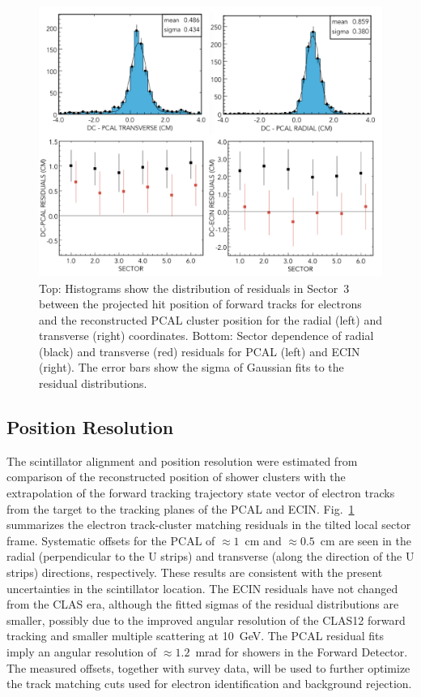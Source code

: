 \begin{figure}[t]
\centering
\includegraphics[width=1.0\columnwidth,keepaspectratio]{img/S10_1_3.png}
\caption[]{Top: Histograms show the distribution of residuals in Sector~3 between the projected hit position of
  forward tracks for electrons and the reconstructed PCAL cluster position for the radial (left) and transverse
  (right) coordinates. Bottom: Sector dependence of radial (black) and transverse (red) residuals for PCAL (left)
  and ECIN (right). The error bars show the sigma of Gaussian fits to the residual distributions.}
\label{fig:S10_1_3}
\end{figure}

\subsection{Position Resolution}

The scintillator alignment and position resolution were estimated from comparison of the reconstructed position of
shower clusters with the extrapolation of the forward tracking trajectory state vector of electron tracks from the
target to the tracking planes of the PCAL and ECIN. Fig.~\ref{fig:S10_1_3} summarizes the electron track-cluster
matching residuals in the tilted local sector frame. Systematic offsets for the PCAL of $\approx 1$~cm and
$\approx 0.5$~cm are seen in the radial (perpendicular to the U strips) and transverse (along the direction of the
U strips) directions, respectively. These results are consistent with the present uncertainties in the scintillator
location. The ECIN residuals have not changed from the CLAS era, although the fitted sigmas of the residual
distributions are smaller, possibly due to the improved angular resolution of the CLAS12 forward tracking and
smaller multiple scattering at 10~GeV. The PCAL residual fits imply an angular resolution of $\approx 1.2$~mrad
for showers in the Forward Detector. The measured offsets, together with survey data, will be used to further
optimize the track matching cuts used for electron identification and background rejection. 

